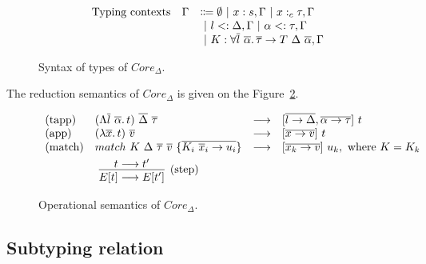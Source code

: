 \documentclass[11pt]{article}
\newcommand{\vor}{~|~}
\newcommand{\ap}{~}
\begin{document}
\begin{figure}
\[\begin{array}{lrl}
                \text{Typing contexts}          & \Gamma             & \Coloneqq \emptyset \vor x : s, \Gamma \vor x :_c \tau, \Gamma                                                     \\
                &                    & \vor l <: \Delta, \Gamma \vor \alpha <: \tau, \Gamma                                                               \\
                &                    & \vor K : \forall \overline{l}\ \overline{\alpha}\ldotp \overline{\tau}\to T \ap\Delta\ap \overline{\alpha}, \Gamma
            \end{array}
        \]
        \caption{Syntax of types of $Core_\Delta$.}
        \label{fig:core-types}
    \end{figure}


    The reduction semantics of $Core_\Delta$ is given on the Figure\ \ref{fig:core-operational}.

    \begin{figure}
        \begin{gather*}
            \begin{array}{llll}
                \text{(tapp)} & (\Lambda \overline{l}~\overline{\alpha}\ldotp t)\ap \overline{\Delta} \ap \overline{\tau} & \longrightarrow & [\overline{l \to \Delta}, \overline{\alpha\to\tau}]\ap t
                \\
                \text{(app)} & (\lambda \overline{x}\ldotp t) \ap \overline{v} & \longrightarrow & [\overline{x\to v}]\ap t
                \\
                \text{(match)} & match ~K \ap\Delta\ap\overline{\tau}\ap \overline{v} ~ \{ \overline{K_i \ap \overline{x}_i \to u_i}\} & \longrightarrow & [\overline{x_k\to v}]\ap u_k, \text{ where } K = K_k
            \end{array}\\
            \hspace{-15em}\infer[\text{(step)}]{E[t]\longrightarrow E[t']}{t\longrightarrow t'}
        \end{gather*}
        \caption{Operational semantics of $Core_\Delta$.}
        \label{fig:core-operational}
    \end{figure}

    \subsection{Subtyping relation}
\end{document}
